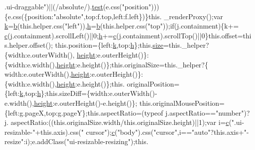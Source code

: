 \begin{DoxyCode}
{      .ui-draggable"})||(/absolute/).\hyperlink{inv__mpu_8c_a1e8f8b1ef7fb2c429e1ce7c2f9985530}{test}(e.css(\textcolor{stringliteral}{"position"})))\{e.css(\{position:\textcolor{stringliteral}{"absolute"},top:f.top,left:f.left\})\}this.
      \_renderProxy();var \hyperlink{jquery_8js_ab26645c014aa005ecedef329ecf58c99}{k}=\hyperlink{jquery_8js_aa4026ad5544b958e54ce5e106fa1c805}{b}(this.helper.css(\textcolor{stringliteral}{"left"})),\hyperlink{all__1a_8js_aebecdaf2444e2be39f4804412d6a3bf8}{h}=\hyperlink{jquery_8js_aa4026ad5544b958e54ce5e106fa1c805}{b}(this.helper.css(\textcolor{stringliteral}{"top"}));\textcolor{keywordflow}{if}(j.containment)\{k+=
      \hyperlink{jquery_8js_ad171626e81625b5e9f5cb177a3a8fb1c}{c}(j.containment).scrollLeft()||0;\hyperlink{all__1a_8js_aebecdaf2444e2be39f4804412d6a3bf8}{h}+=\hyperlink{jquery_8js_ad171626e81625b5e9f5cb177a3a8fb1c}{c}(j.containment).scrollTop()||0\}this.offset=this.helper.offset();
      this.position=\{left:\hyperlink{jquery_8js_ab26645c014aa005ecedef329ecf58c99}{k},top:\hyperlink{all__1a_8js_aebecdaf2444e2be39f4804412d6a3bf8}{h}\};this.\hyperlink{all__15_8js_acbd9773931ec61196e11d59d52b43cb3}{size}=this.\_helper?\{width:e.outerWidth(),
      \hyperlink{styr_2styr_2main_8c_a48083b65ac9a863566dc3e3fff09a5b4}{height}:e.outerHeight()\}:\{width:e.width(),\hyperlink{styr_2styr_2main_8c_a48083b65ac9a863566dc3e3fff09a5b4}{height}:e.height()\};this.originalSize=this.\_helper?\{
      width:e.outerWidth(),\hyperlink{styr_2styr_2main_8c_a48083b65ac9a863566dc3e3fff09a5b4}{height}:e.outerHeight()\}:\{width:e.width(),\hyperlink{styr_2styr_2main_8c_a48083b65ac9a863566dc3e3fff09a5b4}{height}:e.height()\};this.
      originalPosition=\{left:\hyperlink{jquery_8js_ab26645c014aa005ecedef329ecf58c99}{k},top:\hyperlink{all__1a_8js_aebecdaf2444e2be39f4804412d6a3bf8}{h}\};this.sizeDiff=\{width:e.outerWidth()-e.width(),\hyperlink{styr_2styr_2main_8c_a48083b65ac9a863566dc3e3fff09a5b4}{height}:e.outerHeight()-e.height()\};
      this.originalMousePosition=\{left:g.pageX,top:g.pageY\};this.aspectRatio=(typeof j.aspectRatio==\textcolor{stringliteral}{"number"})?j.
      aspectRatio:((\textcolor{keyword}{this}.originalSize.width/\textcolor{keyword}{this}.originalSize.height)||1);var i=\hyperlink{jquery_8js_ad171626e81625b5e9f5cb177a3a8fb1c}{c}(\textcolor{stringliteral}{".ui-resizable-"}+this.axis).css(\textcolor{stringliteral}{"
      cursor"});\hyperlink{jquery_8js_ad171626e81625b5e9f5cb177a3a8fb1c}{c}(\textcolor{stringliteral}{"body"}).css(\textcolor{stringliteral}{"cursor"},i==\textcolor{stringliteral}{"auto"}?this.axis+\textcolor{stringliteral}{"-resize"}:i);e.addClass(\textcolor{stringliteral}{"ui-resizable-resizing"});this.

\end{DoxyCode}
